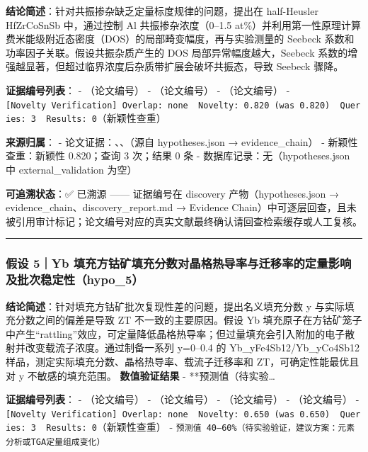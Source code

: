 \documentclass[12pt,a4paper]{ctexart}
\begin{document}
\textbf{结论简述}：针对共振掺杂缺乏定量标度规律的问题，提出在 half-Heusler HfZrCoSnSb 中，通过控制 Al 共振掺杂浓度（0--1.5 at\%）并利用第一性原理计算费米能级附近态密度（DOS）的局部畸变幅度，再与实验测量的 Seebeck 系数和功率因子关联。假设共振杂质产生的 DOS 局部异常幅度越大，Seebeck 系数的增强越显著，但超过临界浓度后杂质带扩展会破坏共振态，导致 Seebeck 骤降。

\textbf{证据编号列表}： - \texttt{\cite{TE146}}（论文编号） - \texttt{\cite{TE087}}（论文编号） - \texttt{\cite{TE101}}（论文编号） - \texttt{{[}Novelty\ Verification{]}\ Overlap:\ none\ \textbar{}\ Novelty:\ 0.820\ (was\ 0.820)\ \textbar{}\ Queries:\ 3\ \textbar{}\ Results:\ 0}（新颖性查重）

\textbf{来源归属}： - 论文证据：\texttt{\cite{TE146}}、\texttt{\cite{TE087}}、\texttt{\cite{TE101}}（源自 hypotheses.json → evidence\_chain） - 新颖性查重：新颖性 0.820；查询 3 次；结果 0 条 - 数据库记录：无（hypotheses.json 中 external\_validation 为空）

\textbf{可追溯状态}：✅ 已溯源 ------ 证据编号在 discovery 产物（hypotheses.json → evidence\_chain、discovery\_report.md → Evidence Chain）中可逐层回查，且未被引用审计标记；论文编号对应的真实文献最终确认请回查检索缓存或人工复核。

\begin{center}\rule{0.5\linewidth}{0.5pt}\end{center}

\subsubsection{假设 5｜Yb 填充方钴矿填充分数对晶格热导率与迁移率的定量影响及批次稳定性（hypo\_5）}\label{ux5047ux8bbe-5yb-ux586bux5145ux65b9ux94b4ux77ffux586bux5145ux5206ux6570ux5bf9ux6676ux683cux70edux5bfcux7387ux4e0eux8fc1ux79fbux7387ux7684ux5b9aux91cfux5f71ux54cdux53caux6279ux6b21ux7a33ux5b9aux6027hypo_5}

\textbf{结论简述}：针对填充方钴矿批次复现性差的问题，提出名义填充分数 y 与实际填充分数之间的偏差是导致 ZT 不一致的主要原因。假设 Yb 填充原子在方钴矿笼子中产生``rattling''效应，可定量降低晶格热导率；但过量填充会引入附加的电子散射并改变载流子浓度。通过制备一系列 y=0--0.4 的 Yb\_yFe4Sb12/Yb\_yCo4Sb12 样品，测定实际填充分数、晶格热导率、载流子迁移率和 ZT，可确定性能最优且对 y 不敏感的填充范围。 \textbf{数值验证结果} - **预测值（待实验\ldots{}

\textbf{证据编号列表}： - \texttt{\cite{TE048}}（论文编号） - \texttt{\cite{TE035}}（论文编号） - \texttt{\cite{TE037}}（论文编号） - \texttt{\cite{TE051}}（论文编号） - \texttt{{[}Novelty\ Verification{]}\ Overlap:\ none\ \textbar{}\ Novelty:\ 0.650\ (was\ 0.650)\ \textbar{}\ Queries:\ 3\ \textbar{}\ Results:\ 0}（新颖性查重） - \texttt{预测值\ 40–60\%（待实验验证，建议方案：元素分析或TGA定量组成变化）}
\end{document}
